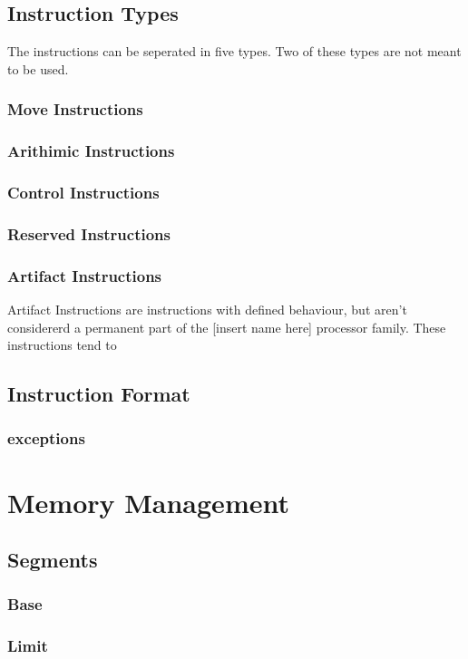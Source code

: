 \documentclass[oneside, a4paper]{memoir}
\begin{document}
\section{Instruction Types}
The instructions can be seperated in five types. Two of these types are not meant to be used. 
\subsection{Move Instructions}
\subsection{Arithimic Instructions}
\subsection{Control Instructions}
\subsection{Reserved Instructions}
\subsection{Artifact Instructions}
Artifact Instructions are instructions with defined behaviour, but aren't considererd a permanent part of the [insert name here] processor family. These instructions tend to 

\section{Instruction Format}
\subsection{exceptions}

\chapter{Memory Management}
\label{ch:Memory Management}
\section{Segments}
\subsection{Base}
\subsection{Limit}
\end{document}
